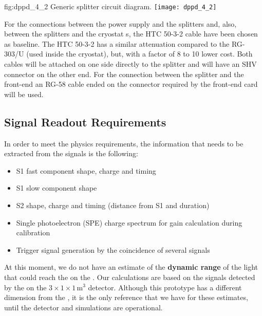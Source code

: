 \begin{dunefigure}{fig:dppd_4_2}
{Generic splitter circuit diagram.}
\texttt{[image: dppd\_4\_2]}
\end{dunefigure}

For the connections between the  power supply and the splitters and, also, between the splitters and the cryostat \fdth{}s, the HTC 50-3-2 cable have been chosen as baseline. The HTC 50-3-2 has a similar attenuation compared to the RG-303/U (used inside the cryostat), but, with a factor of 8 to 10 lower cost. Both cables will be attached on one side directly to the  splitter and will have an SHV connector on the other end. For the connection between the splitter and the front-end an RG-58 cable ended on the connector required by the front-end card will be used.

\subsection{Signal Readout Requirements}
\label{sec:fddp-pd-4.3}

In order to meet the physics requirements, the information that needs to be extracted from the  signals is the following:

\begin{itemize}
\item S1 fast component shape, charge and timing
\item S1 slow component shape
\item S2 shape, charge and timing (distance from S1 and duration)
\item Single photoelectron (SPE) charge spectrum for gain calculation during  calibration
\item Trigger signal generation by the coincidence of several  signals
\end{itemize}

At this moment, we do not have an estimate of the \textbf{dynamic range }of the light that could reach the  on the . Our calculations are based on the signals detected by the  on the   $3\times1\times1$\,m$^3$ detector. Although this prototype has a different dimension from the , it is the only reference that we have for these estimates, until the  detector and simulations are operational.

